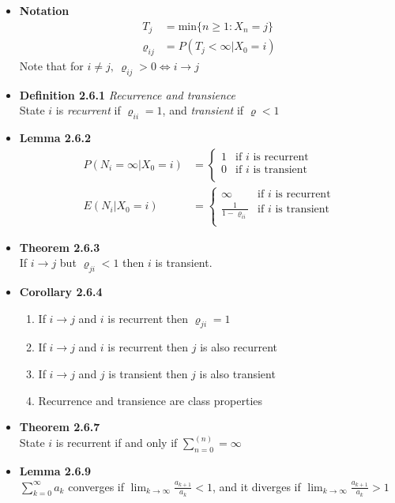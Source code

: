 \documentclass[11pt,a4paper]{article}
\begin{document}
\begin{itemize}

    \item \textbf{Notation} \\
        \begin{align*}{}
            T_j          & = \text{min}\{n \geq 1 : X_n = j\} \\
            \varrho_{ij} & = P(T_j < \infty | X_0 = i)
        \end{align*}
        Note that for $i \neq j,\ \varrho_{ij} > 0 \iff i \rightarrow j$
    \item \textbf{Definition 2.6.1} \emph{Recurrence and transience} \\
        State $i$ is \emph{recurrent} if $\varrho_{ii} = 1$, and \emph{transient} if $\varrho < 1$
    \item \textbf{Lemma 2.6.2}
        \begin{align*}{}
            P(N_i = \infty | X_0 = i) &=
            \begin{cases}{}
                1 & \text{if $i$ is recurrent} \\
                0 & \text{if $i$ is transient} \\
            \end{cases} \\
            E(N_i | X_0 = i) &=
            \begin{cases}{}
                \infty & \text{if $i$ is recurrent} \\
                \frac{1}{1 - \varrho_{ii}} & \text{if $i$ is transient} \\
            \end{cases}
        \end{align*}
    \item \textbf{Theorem 2.6.3} \\
        If $i \rightarrow j$ but $\varrho_{ji} < 1$ then $i$ is transient.
    \item \textbf{Corollary 2.6.4}
        \begin{enumerate}
            \item If $i \rightarrow j$ and $i$ is recurrent then $\varrho_{ji} = 1$
            \item If $i \rightarrow j$ and $i$ is recurrent then $j$ is also recurrent
            \item If $i \rightarrow j$ and $j$ is transient then $j$ is also transient
            \item Recurrence and transience are class properties
        \end{enumerate}
    \item \textbf{Theorem 2.6.7} \\
        State $i$ is recurrent if and only if $\sum_{n=0}^{(n)} = \infty$
    \item \textbf{Lemma 2.6.9} \\
        $\sum_{k=0}^{\infty}a_k$ converges if $\lim_{k \to \infty} \frac{a_{k+1}}{a_k} < 1$,
        and it diverges if $\lim_{k \to \infty} \frac{a_{k+1}}{a_k} > 1$

\end{itemize}
\end{document}
